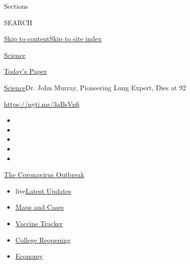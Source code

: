 Sections

SEARCH

\protect\hyperlink{site-content}{Skip to
content}\protect\hyperlink{site-index}{Skip to site index}

\href{https://www.nytimes.com/section/science}{Science}

\href{https://myaccount.nytimes.com/auth/login?response_type=cookie\&client_id=vi}{}

\href{https://www.nytimes.com/section/todayspaper}{Today's Paper}

\href{/section/science}{Science}\textbar{}Dr. John Murray, Pioneering
Lung Expert, Dies at 92

\url{https://nyti.ms/3aBsVn6}

\begin{itemize}
\item
\item
\item
\item
\item
\end{itemize}

\href{https://www.nytimes.com/news-event/coronavirus?action=click\&pgtype=Article\&state=default\&region=TOP_BANNER\&context=storylines_menu}{The
Coronavirus Outbreak}

\begin{itemize}
\tightlist
\item
  live\href{https://www.nytimes.com/2020/08/03/world/coronavirus-covid-19.html?action=click\&pgtype=Article\&state=default\&region=TOP_BANNER\&context=storylines_menu}{Latest
  Updates}
\item
  \href{https://www.nytimes.com/interactive/2020/us/coronavirus-us-cases.html?action=click\&pgtype=Article\&state=default\&region=TOP_BANNER\&context=storylines_menu}{Maps
  and Cases}
\item
  \href{https://www.nytimes.com/interactive/2020/science/coronavirus-vaccine-tracker.html?action=click\&pgtype=Article\&state=default\&region=TOP_BANNER\&context=storylines_menu}{Vaccine
  Tracker}
\item
  \href{https://www.nytimes.com/2020/08/02/us/covid-college-reopening.html?action=click\&pgtype=Article\&state=default\&region=TOP_BANNER\&context=storylines_menu}{College
  Reopening}
\item
  \href{https://www.nytimes.com/live/2020/08/03/business/stock-market-today-coronavirus?action=click\&pgtype=Article\&state=default\&region=TOP_BANNER\&context=storylines_menu}{Economy}
\end{itemize}

